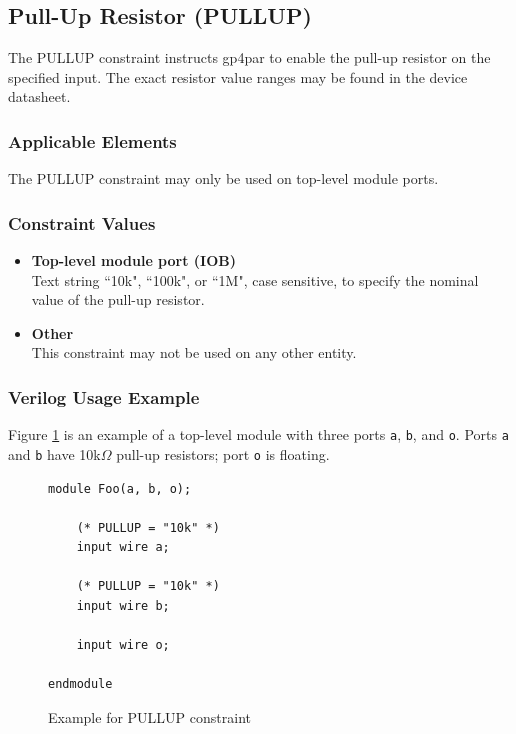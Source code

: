 \documentclass{article}
\begin{document}

\pagebreak
\subsection{Pull-Up Resistor (PULLUP)}

The PULLUP constraint instructs gp4par to enable the pull-up resistor on the specified input. The exact resistor 
value ranges may be found in the device datasheet.

\subsubsection{Applicable Elements}
The PULLUP constraint may only be used on top-level module ports. 

\subsubsection{Constraint Values}
\begin{itemize}
\item {\bfseries Top-level module port (IOB)}\\
Text string ``10k", ``100k", or ``1M", case sensitive, to specify the nominal value of the pull-up resistor.
\item {\bfseries Other} \\
This constraint may not be used on any other entity.
\end{itemize}

\subsubsection{Verilog Usage Example}

Figure \ref{constraint-pullup} is an example of a top-level module with three ports \texttt{a}, \texttt{b}, and
\texttt{o}. Ports \texttt{a} and \texttt{b} have 10k$\Omega$ pull-up resistors; port \texttt{o} is floating.

\begin{figure}[h]
\begin{lstlisting}
module Foo(a, b, o);

	(* PULLUP = "10k" *)
	input wire a;

	(* PULLUP = "10k" *)
	input wire b;

	input wire o;
	
endmodule
\end{lstlisting}
\caption{Example for PULLUP constraint}
\label{constraint-pullup}
\end{figure}
\end{document}
